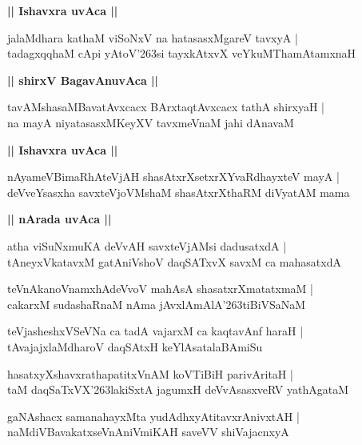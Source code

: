 \documentclass[twoside,12pt,openright]{book}
\def\S{\char'263}
\newcounter{shloka}[chapter]
\def\uvaca#1{\centerline{{\large\textbf{#1}}}}
\begin{document}
\uvaca{|| Ishavxra uvAca ||}

\begin{shloka}%
jalaMdhara kathaM viSoNxV na hatasasxMgareV tavxyA |\\
tadagxqqhaM cApi yAtoV\S si tayxkAtxvX veYkuMThamAtamxnaH 
\end{shloka}

\uvaca{|| shirxV BagavAnuvAca ||}

\begin{shloka}%
tavAMshasaMBavatAvxcacx BArxtaqtAvxcacx tathA shirxyaH |\\
na mayA niyatasasxMKeyXV tavxmeVnaM jahi dAnavaM 
\end{shloka}

\uvaca{|| Ishavxra uvAca ||}

\begin{shloka}%
nAyameVBimaRhAteVjAH shasAtxrXsetxrXYvaRdhayxteV mayA |\\
deVveYsasxha savxteVjoVMshaM shasAtxrXthaRM diVyatAM mama
\end{shloka}

\uvaca{|| nArada uvAca ||}

\begin{shloka}%
atha viSuNxmuKA deVvAH savxteVjAMsi dadusatxdA |\\
tAneyxVkatavxM gatAniVshoV daqSATxvX savxM ca mahasatxdA 
\end{shloka}

\begin{shloka}%
teVnAkanoVnamxhAdeVvoV mahAsA shasatxrXmatatxmaM |\\
cakarxM sudashaRnaM nAma jAvxlAmAlA\S tiBiVSaNaM 
\end{shloka}

\begin{shloka}%
teVjasheshxVSeVNa ca tadA vajarxM ca kaqtavAnf haraH |\\
tAvajajxlaMdharoV daqSAtxH keYlAsatalaBAmiSu
\end{shloka}

\begin{shloka}%
hasatxyXshavxrathapatitxVnAM koVTiBiH parivAritaH |\\
taM daqSaTxVX\S lakiSxtA jagumxH deVvAsasxveRV yathAgataM 
\end{shloka}

\begin{shloka}%
gaNAshacx samanahayxMta yudAdhxyAtitavxrAnivxtAH |\\
naMdiVBavakatxseVnAniVmiKAH saveVV shiVajacnxyA 
\end{shloka}
\end{document}
